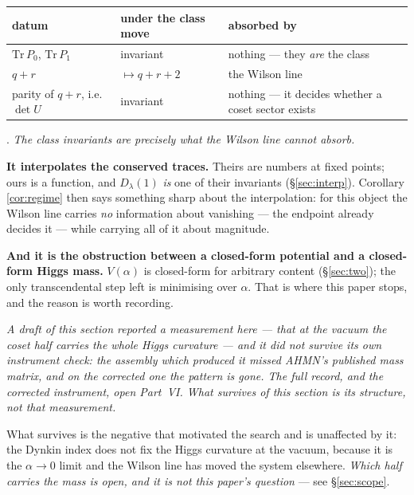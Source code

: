 \documentclass[11pt,a4paper]{article}
\newcommand{\Dl}{D_\lambda}
\begin{document}
\begin{center}\small
{}
\begin{tabular}{lll}
\toprule
\rowcolor{hdrblue!14}datum & under the class move & absorbed by\\
\midrule
$\mathrm{Tr}\,P_0$, $\mathrm{Tr}\,P_1$ & invariant & nothing --- they \emph{are} the class\\
$q+r$ & $\mapsto q+r+2$ & the Wilson line\\
parity of $q+r$, i.e.\ $\det U$ & invariant & nothing --- it decides whether a coset sector exists\\
\bottomrule
\end{tabular}
\end{center}

. \emph{The class invariants are precisely what the Wilson
line cannot absorb.}

\textbf{It interpolates the conserved traces.} Theirs are numbers at fixed points; ours is a
function, and $\Dl(1)$ \emph{is} one of their invariants (\S\ref{sec:interp}). Corollary
\ref{cor:regime} then says something sharp about the interpolation: for this object the Wilson line
carries \emph{no} information about vanishing --- the endpoint already decides it --- while carrying
all of it about magnitude.

\textbf{And it is the obstruction between a closed-form potential and a closed-form Higgs mass.}
$V(\alpha)$ is closed-form for arbitrary content (\S\ref{sec:two}); the only transcendental step left
is minimising over $\alpha$. That is where this paper stops, and the reason is worth recording.

\emph{A draft of this section reported a measurement here --- that at the vacuum the coset half
carries the whole Higgs curvature --- and it did not survive its own instrument check: the assembly
which produced it missed AHMN's published mass matrix, and on the corrected one the pattern is gone.
The full record, and the corrected instrument, open Part~VI. What survives of this section is its
structure, not that measurement.}

\noindent What survives is the negative that motivated the search and is unaffected by it: the Dynkin
index does not fix the Higgs curvature at the vacuum, because it is the $\alpha\to0$ limit and the
Wilson line has moved the system elsewhere. \emph{Which half carries the mass is open, and it is not
this paper's question} --- see \S\ref{sec:scope}.
\end{document}
